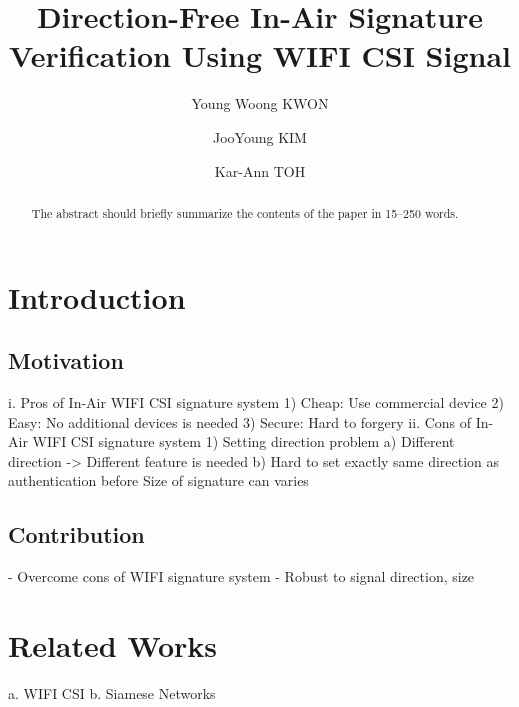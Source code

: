 \documentclass[runningheads]{llncs}
\begin{document}
%
\title{Direction-Free In-Air Signature Verification Using WIFI CSI Signal}
%
%
\author{Young Woong KWON \and
JooYoung KIM \and
Kar-Ann TOH}
%
%
%
\maketitle              %
%
\begin{abstract}
The abstract should briefly summarize the contents of the paper in
15--250 words.

\end{abstract}
%
%
%
\section{Introduction}

\subsection{Motivation}
i. Pros of In-Air WIFI CSI signature system
1) Cheap: Use commercial device
2) Easy: No additional devices is needed
3) Secure: Hard to forgery
ii. Cons of In-Air WIFI CSI signature system
1) Setting direction problem
a) Different direction -> Different feature is needed
b) Hard to set exactly same direction as authentication before
Size of signature can varies

\subsection{Contribution}
- Overcome cons of WIFI signature system
- Robust to signal direction, size

\section{Related Works}
a. WIFI CSI
b. Siamese Networks
\end{document}
